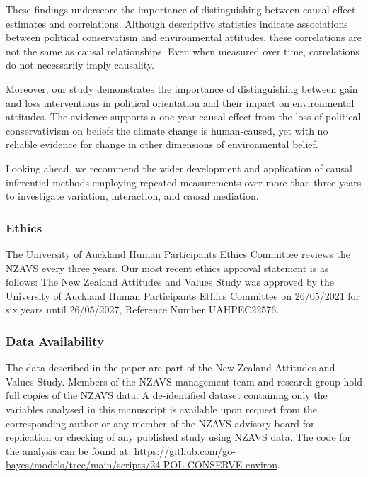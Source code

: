 \documentclass[
  single column]{article}
\begin{document}
These findings underscore the importance of distinguishing between
causal effect estimates and correlations. Although descriptive
statistics indicate associations between political conservatism and
environmental attitudes, these correlations are not the same as causal
relationships. Even when measured over time, correlations do not
necessarily imply causality.

Moreover, our study demonstrates the importance of distinguishing
between gain and loss interventions in political orientation and their
impact on environmental attitudes. The evidence supports a one-year
causal effect from the loss of political conservativism on beliefs the
climate change is human-caused, yet with no reliable evidence for change
in other dimensions of environmental belief.

Looking ahead, we recommend the wider development and application of
causal inferential methods employing repeated measurements over more
than three years to investigate variation, interaction, and causal
mediation.

\newpage{}

\subsubsection{Ethics}\label{ethics}

The University of Auckland Human Participants Ethics Committee reviews
the NZAVS every three years. Our most recent ethics approval statement
is as follows: The New Zealand Attitudes and Values Study was approved
by the University of Auckland Human Participants Ethics Committee on
26/05/2021 for six years until 26/05/2027, Reference Number UAHPEC22576.

\subsubsection{Data Availability}\label{data-availability}

The data described in the paper are part of the New Zealand Attitudes
and Values Study. Members of the NZAVS management team and research
group hold full copies of the NZAVS data. A de-identified dataset
containing only the variables analysed in this manuscript is available
upon request from the corresponding author or any member of the NZAVS
advisory board for replication or checking of any published study using
NZAVS data. The code for the analysis can be found at:
\url{https://github.com/go-bayes/models/tree/main/scripts/24-POL-CONSERVE-environ}.
\end{document}
